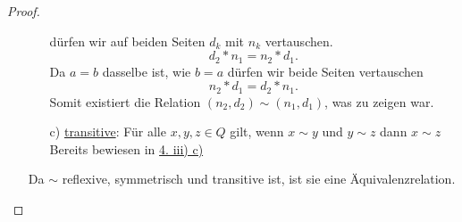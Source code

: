 \documentclass{exam}
\begin{document}
\begin{proof}
\begin{enumerate}
\begin{enumerate}
                        dürfen wir auf beiden Seiten $d_k$ mit $n_k$ vertauschen.
                        \[
                            d_2*n_1=n_2*d_1.
                        \]
                        Da $a = b$ dasselbe ist, wie $b = a$ dürfen wir beide Seiten vertauschen \[
                            n_2*d_1 = d_2*n_1.
                        \]
                        Somit existiert die Relation $(n_2,d_2) \sim (n_1, d_1)$, was zu zeigen war.
                  \item [c)] \underline{transitive}: Für alle $x,y,z \in Q$ gilt, wenn $x \sim y$ und $y \sim z$ dann $x \sim z$ \newline
                        Bereits bewiesen in \underline{4. iii) c)}
              \end{enumerate}
              Da $\sim$ reflexive, symmetrisch und transitive ist, ist sie eine Äquivalenzrelation.
    \end{enumerate}
\end{proof}
\end{document}
